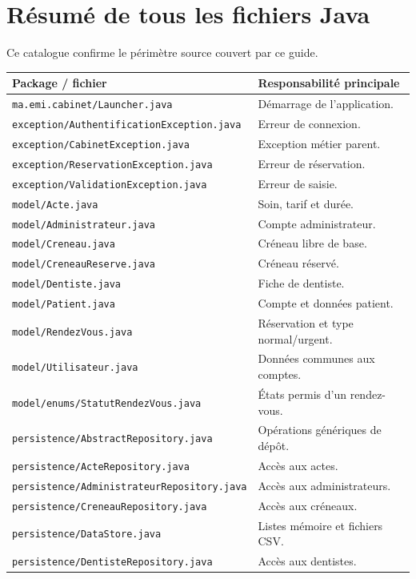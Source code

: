 \documentclass[11pt,a4paper]{report}
\begin{document}
\chapter{Résumé de tous les fichiers Java}
Ce catalogue confirme le périmètre source couvert par ce guide.
\begin{longtable}{p{}p{}}
\textbf{Package / fichier} & \textbf{Responsabilité principale} \\\hline
\texttt{ma.emi.cabinet/Launcher.java} & Démarrage de l'application. \\
\texttt{exception/AuthentificationException.java} & Erreur de connexion. \\
\texttt{exception/CabinetException.java} & Exception métier parent. \\
\texttt{exception/ReservationException.java} & Erreur de réservation. \\
\texttt{exception/ValidationException.java} & Erreur de saisie. \\
\texttt{model/Acte.java} & Soin, tarif et durée. \\
\texttt{model/Administrateur.java} & Compte administrateur. \\
\texttt{model/Creneau.java} & Créneau libre de base. \\
\texttt{model/CreneauReserve.java} & Créneau réservé. \\
\texttt{model/Dentiste.java} & Fiche de dentiste. \\
\texttt{model/Patient.java} & Compte et données patient. \\
\texttt{model/RendezVous.java} & Réservation et type normal/urgent. \\
\texttt{model/Utilisateur.java} & Données communes aux comptes. \\
\texttt{model/enums/StatutRendezVous.java} & États permis d'un rendez-vous. \\
\texttt{persistence/AbstractRepository.java} & Opérations génériques de dépôt. \\
\texttt{persistence/ActeRepository.java} & Accès aux actes. \\
\texttt{persistence/AdministrateurRepository.java} & Accès aux administrateurs. \\
\texttt{persistence/CreneauRepository.java} & Accès aux créneaux. \\
\texttt{persistence/DataStore.java} & Listes mémoire et fichiers CSV. \\
\texttt{persistence/DentisteRepository.java} & Accès aux dentistes. \\

\end{longtable}
\end{document}
